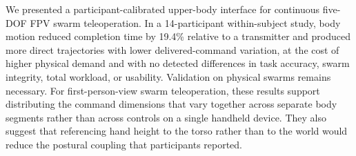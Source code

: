 \documentclass[a4paper,10pt,conference]{ieeeconf}
\begin{document}
We presented a participant-calibrated upper-body interface for continuous
five-DOF FPV swarm teleoperation. In a 14-participant within-subject study,
body motion reduced completion time by 19.4\% relative to a transmitter and
produced more direct trajectories with lower delivered-command variation, at the
cost of higher physical demand and with no detected differences in task
accuracy, swarm integrity, total workload, or usability. Validation on physical
swarms remains necessary. For first-person-view swarm teleoperation, these
results support distributing the command dimensions that vary together across
separate body segments rather than across controls on a single handheld device. They also suggest that referencing hand height to the torso rather than to the
world would reduce the postural coupling that participants reported.



\end{document}
